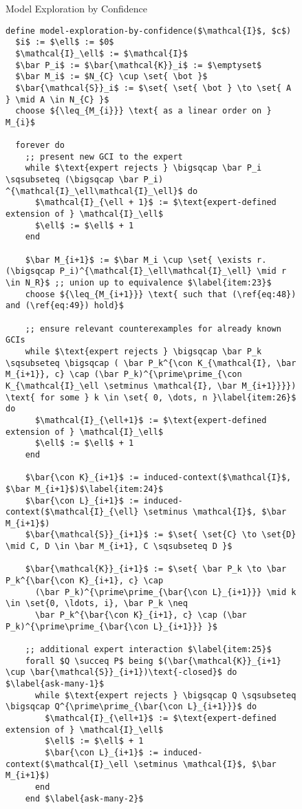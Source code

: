 \begin{figure}[tp]
  \begin{Algorithm}
    \label{alg:model-exploration-by-confidence} Model Exploration by Confidence
    \begin{lstlisting}
define model-exploration-by-confidence($\mathcal{I}$, $c$)
  $i$ := $\ell$ := $0$
  $\mathcal{I}_\ell$ := $\mathcal{I}$
  $\bar P_i$ := $\bar{\mathcal{K}}_i$ := $\emptyset$
  $\bar M_i$ := $N_{C} \cup \set{ \bot }$
  $\bar{\mathcal{S}}_i$ := $\set{ \set{ \bot } \to \set{ A } \mid A \in N_{C} }$
  choose ${\leq_{M_{i}}} \text{ as a linear order on } M_{i}$

  forever do
    ;; present new GCI to the expert
    while $\text{expert rejects } \bigsqcap \bar P_i \sqsubseteq (\bigsqcap \bar P_i) ^{\mathcal{I}_\ell\mathcal{I}_\ell}$ do
      $\mathcal{I}_{\ell + 1}$ := $\text{expert-defined extension of } \mathcal{I}_\ell$
      $\ell$ := $\ell$ + 1
    end

    $\bar M_{i+1}$ := $\bar M_i \cup \set{ \exists r. (\bigsqcap P_i)^{\mathcal{I}_\ell\mathcal{I}_\ell} \mid r \in N_R}$ ;; union up to equivalence $\label{item:23}$
    choose ${\leq_{M_{i+1}}} \text{ such that (\ref{eq:48}) and (\ref{eq:49}) hold}$

    ;; ensure relevant counterexamples for already known GCIs
    while $\text{expert rejects } \bigsqcap \bar P_k \sqsubseteq \bigsqcap ( \bar P_k^{\con K_{\mathcal{I}, \bar M_{i+1}}, c} \cap (\bar P_k)^{\prime\prime_{\con K_{\mathcal{I}_\ell \setminus \mathcal{I}, \bar M_{i+1}}}}) \text{ for some } k \in \set{ 0, \dots, n }\label{item:26}$ do
      $\mathcal{I}_{\ell+1}$ := $\text{expert-defined extension of } \mathcal{I}_\ell$
      $\ell$ := $\ell$ + 1
    end

    $\bar{\con K}_{i+1}$ := induced-context($\mathcal{I}$, $\bar M_{i+1}$)$\label{item:24}$
    $\bar{\con L}_{i+1}$ := induced-context($\mathcal{I}_{\ell} \setminus \mathcal{I}$, $\bar M_{i+1}$)  
    $\bar{\mathcal{S}}_{i+1}$ := $\set{ \set{C} \to \set{D} \mid C, D \in \bar M_{i+1}, C \sqsubseteq D }$

    $\bar{\mathcal{K}}_{i+1}$ := $\set{ \bar P_k \to \bar P_k^{\bar{\con K}_{i+1}, c} \cap
      (\bar P_k)^{\prime\prime_{\bar{\con L}_{i+1}}} \mid k \in \set{0, \ldots, i}, \bar P_k \neq
      \bar P_k^{\bar{\con K}_{i+1}, c} \cap (\bar P_k)^{\prime\prime_{\bar{\con L}_{i+1}}} }$

    ;; additional expert interaction $\label{item:25}$
    forall $Q \succeq P$ being $(\bar{\mathcal{K}}_{i+1} \cup \bar{\mathcal{S}}_{i+1})\text{-closed}$ do $\label{ask-many-1}$
      while $\text{expert rejects } \bigsqcap Q \sqsubseteq \bigsqcap Q^{\prime\prime_{\bar{\con L}_{i+1}}}$ do
        $\mathcal{I}_{\ell+1}$ := $\text{expert-defined extension of } \mathcal{I}_\ell$
        $\ell$ := $\ell$ + 1
        $\bar{\con L}_{i+1}$ := induced-context($\mathcal{I}_\ell \setminus \mathcal{I}$, $\bar M_{i+1}$)
      end
    end $\label{ask-many-2}$


\end{lstlisting}
\end{Algorithm}
\end{figure}

